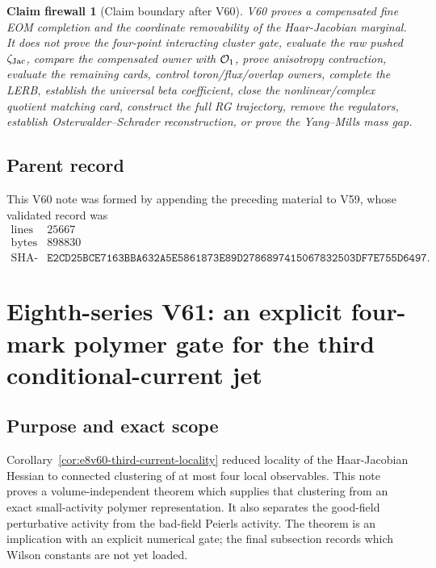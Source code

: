\documentclass[11pt,oneside]{book}
\newtheorem{firewall}[theorem]{Claim firewall}
\theoremstyle{definition}
\theoremstyle{remark}
\begin{document}
\begin{firewall}[Claim boundary after V60]
\label{fire:e8v60-claim}
V60 proves a compensated fine EOM completion and the coordinate
removability of the Haar-Jacobian marginal.  It does not prove the
four-point interacting cluster gate, evaluate the raw pushed
\(\zeta_{\rm Jac}\), compare the compensated owner with
\({\cal O}_1\), prove anisotropy contraction, evaluate the remaining
cards, control toron/flux/overlap owners, complete the LERB,
establish the universal beta coefficient, close the nonlinear/complex
quotient matching card, construct the full RG trajectory, remove the
regulators, establish Osterwalder--Schrader reconstruction, or prove
the Yang--Mills mass gap.
\end{firewall}

\subsection{Parent record}

This V60 note was formed by appending the preceding material to V59,
whose validated record was
\[
\begin{array}{c|c}
\text{lines}&25667\\
\text{bytes}&898830\\
\text{SHA-256}&
\texttt{E2CD25BCE7163BBA632A5E5861873E89D2786897415067832503DF7E755D6497}.
\end{array}
\]



\section{Eighth-series V61: an explicit four-mark polymer gate for
the third conditional-current jet}
\label{sec:e8v61}

\subsection{Purpose and exact scope}

Corollary~\ref{cor:e8v60-third-current-locality} reduced locality of
the Haar-Jacobian Hessian to connected clustering of at most four
local observables.  This note proves a volume-independent theorem
which supplies that clustering from an exact small-activity polymer
representation.  It also separates the good-field perturbative
activity from the bad-field Peierls activity.  The theorem is an
implication with an explicit numerical gate; the final subsection
records which Wilson constants are not yet loaded.
\end{document}
